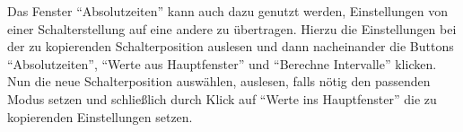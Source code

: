\documentclass[paper=a4, open=any]{scrbook}
\begin{document}
				Das Fenster \enquote{Absolutzeiten} kann auch dazu genutzt werden, Einstellungen von einer Schalterstellung auf eine andere zu übertragen. Hierzu die Einstellungen bei der zu kopierenden Schalterposition auslesen und dann nacheinander die Buttons \enquote{Absolutzeiten}, \enquote{Werte aus Hauptfenster} und \enquote{Berechne Intervalle} klicken. Nun die neue Schalterposition auswählen, auslesen, falls nötig den passenden Modus setzen und schließlich durch Klick auf \enquote{Werte ins Hauptfenster} die zu kopierenden Einstellungen setzen.
\end{document}
